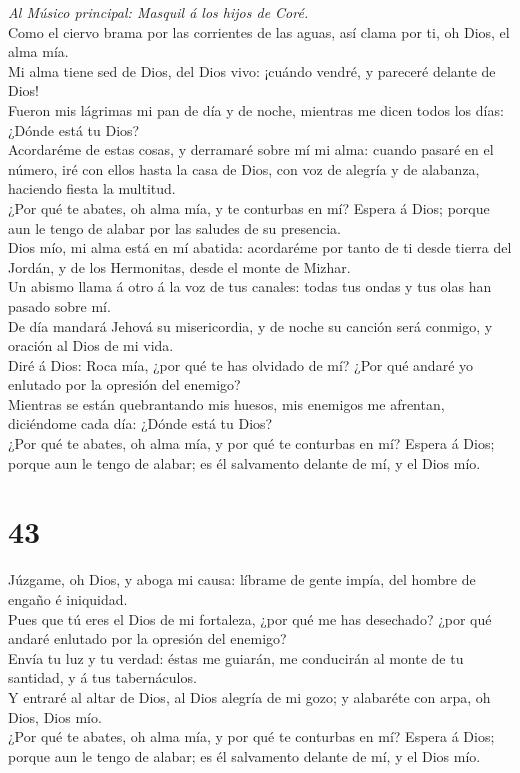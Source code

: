  \emph{Al Músico principal: Masquil á los hijos de Coré.}\\
Como el ciervo brama por las corrientes de las aguas, así clama por ti,
oh Dios, el alma mía.\\
 Mi alma tiene sed de Dios, del Dios vivo: ¡cuándo vendré, y
pareceré delante de Dios!\\
 Fueron mis lágrimas mi pan de día y de noche, mientras me
dicen todos los días: ¿Dónde está tu Dios?\\
 Acordaréme de estas cosas, y derramaré sobre mí mi alma:
cuando pasaré en el número, iré con ellos hasta la casa de Dios, con voz
de alegría y de alabanza, haciendo fiesta la multitud.\\
 ¿Por qué te abates, oh alma mía, y te conturbas en mí?
Espera á Dios; porque aun le tengo de alabar por las saludes de su
presencia.\\
 Dios mío, mi alma está en mí abatida: acordaréme por tanto
de ti desde tierra del Jordán, y de los Hermonitas, desde el monte de
Mizhar.\\
 Un abismo llama á otro á la voz de tus canales: todas tus
ondas y tus olas han pasado sobre mí.\\
 De día mandará Jehová su misericordia, y de noche su
canción será conmigo, y oración al Dios de mi vida.\\
 Diré á Dios: Roca mía, ¿por qué te has olvidado de mí? ¿Por
qué andaré yo enlutado por la opresión del enemigo?\\
 Mientras se están quebrantando mis huesos, mis enemigos me
afrentan, diciéndome cada día: ¿Dónde está tu Dios?\\
 ¿Por qué te abates, oh alma mía, y por qué te conturbas en
mí? Espera á Dios; porque aun le tengo de alabar; es él salvamento
delante de mí, y el Dios mío.

\hypertarget{section-42}{%
\section{43}\label{section-42}}

 Júzgame, oh Dios, y aboga mi causa: líbrame de gente impía,
del hombre de engaño é iniquidad.\\
 Pues que tú eres el Dios de mi fortaleza, ¿por qué me has
desechado? ¿por qué andaré enlutado por la opresión del enemigo?\\
 Envía tu luz y tu verdad: éstas me guiarán, me conducirán
al monte de tu santidad, y á tus tabernáculos.\\
 Y entraré al altar de Dios, al Dios alegría de mi gozo; y
alabaréte con arpa, oh Dios, Dios mío.\\
 ¿Por qué te abates, oh alma mía, y por qué te conturbas en
mí? Espera á Dios; porque aun le tengo de alabar; es él salvamento
delante de mí, y el Dios mío.


